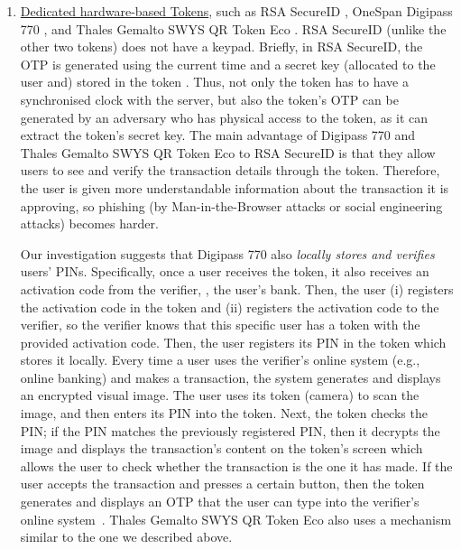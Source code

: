 \begin{enumerate}
\item \underline{Dedicated hardware-based Tokens}, such as RSA SecureID \cite{secureID}, OneSpan Digipass 770 \cite{Digipass-website}, and Thales Gemalto SWYS QR Token Eco \cite{Gemalto}.   RSA SecureID (unlike the other two tokens) does not have a keypad. Briefly, in RSA SecureID, the OTP is generated using the current time and a secret key (allocated to the user and) stored in the token \cite{biryukov2003cryptanalysis}. Thus, not only the token has to have a synchronised clock with the server, but also the token's OTP can be generated by an adversary who has physical access to the token, as it can extract the token's secret key.  The main advantage of  Digipass 770 and Thales Gemalto SWYS QR Token Eco to RSA SecureID is that they allow users to see and verify the transaction details through the token. Therefore, the user is given more understandable information about the transaction it is approving,
so phishing (by Man-in-the-Browser attacks or social engineering attacks) becomes harder. 

 

Our investigation suggests that Digipass 770 also \emph{locally stores and verifies} users' PINs. 
%
Specifically, once a user receives the token, it also receives an activation code from the verifier, \eg, the user's bank.  Then, the user (i) registers the activation code in the token and (ii) registers the activation code to the verifier, so the verifier knows that this specific user has a token with the provided activation code. Then, the user registers its PIN in the token which stores it locally. Every time a user uses the verifier's online system  (e.g., online banking) and makes a transaction, the system generates and displays an encrypted visual image. The user uses its token (camera) to scan the image, and then enters its PIN into the token. Next, the token checks the PIN; if the PIN matches the previously registered PIN, then it decrypts the image and displays the transaction's content on the token's screen which allows the user to check whether the transaction is the one it has made. If the user accepts the transaction and presses a certain button, then the token generates and displays an OTP that the user can type into the verifier's online system~\cite{Digipass-website}.  Thales Gemalto SWYS QR Token Eco also uses a mechanism similar to the one we described above. 


\end{enumerate}
